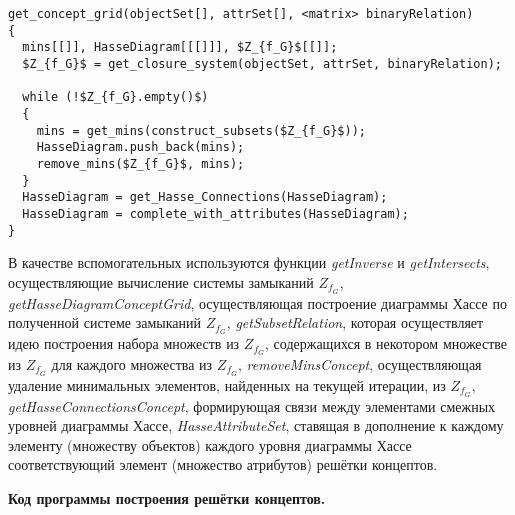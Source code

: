 \documentclass[spec, och, otchet, hidelinks]{SCWorks}
\begin{document}
\begin{lstlisting}[caption=Псевдокод алгоритма., mathescape]
get_concept_grid(objectSet[], attrSet[], <matrix> binaryRelation)
{
  mins[[]], HasseDiagram[[[]]], $Z_{f_G}$[[]];
  $Z_{f_G}$ = get_closure_system(objectSet, attrSet, binaryRelation);
  
  while (!$Z_{f_G}.empty()$)
  {
    mins = get_mins(construct_subsets($Z_{f_G}$));
    HasseDiagram.push_back(mins);
    remove_mins($Z_{f_G}$, mins);
  }
  HasseDiagram = get_Hasse_Connections(HasseDiagram);
  HasseDiagram = complete_with_attributes(HasseDiagram);
}
\end{lstlisting}

\par В качестве вспомогательных используются функции \textit{getInverse} и
\textit{getIntersects}, осуществляющие вычисление системы замыканий $Z_{f_G}$,
\textit{getHasseDiagramConceptGrid}, осуществляющая построение диаграммы Хассе
по полученной системе замыканий $Z_{f_G}$, \textit{getSubsetRelation}, которая
осуществляет идею построения набора множеств из $Z_{f_G}$, содержащихся в
некотором множестве из $Z_{f_G}$ для каждого множества из $Z_{f_G}$,
\textit{removeMinsConcept}, осуществляющая удаление минимальных элементов,
найденных на текущей итерации, из $Z_{f_G}$,
\textit{getHasseConnectionsConcept}, формирующая связи между элементами смежных
уровней диаграммы Хассе, \textit{HasseAttributeSet}, ставящая в дополнение к
каждому элементу (множеству объектов) каждого уровня диаграммы Хассе
соответствующий элемент (множество атрибутов) решётки концептов.
\\
\par \textbf{Код программы построения решётки концептов.}
\end{document}
